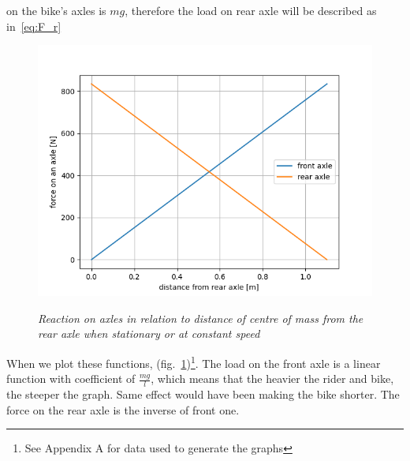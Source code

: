 \documentclass[12pt, a4]{article}
\begin{document}
on the bike's axles is $mg$, therefore the load on rear axle will be described as in~\eqref{eq:F_r}
\begin{figure}[H]
\centering
\caption{\textit{Reaction on axles in relation to distance of centre of mass from the rear axle when stationary or at constant speed}}
\includegraphics[width=0.5\linewidth]{axles_static_graph}%
\label{fig:static_graph}
\end{figure}
When we plot these functions, (fig.~\ref{fig:static_graph})\footnote[1]{See Appendix A for data used to generate the graphs}. 
The load on the front axle is a linear function with coefficient of $\frac{mg}{l}$, which means that the heavier the 
rider and bike, the steeper the graph. Same effect would have been making the bike shorter. The force on the rear 
axle is the inverse of front one.
\end{document}
